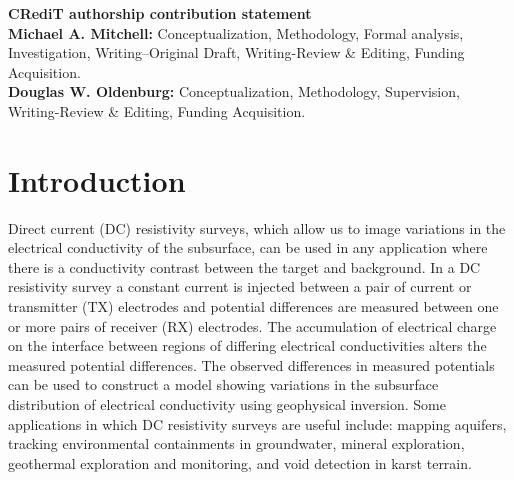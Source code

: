 \documentclass[preprint,authoryear,12pt]{elsarticle}
\begin{document}
\noindent \textbf{CRediT authorship contribution statement} \\
\textbf{Michael A. Mitchell:} Conceptualization, Methodology, Formal analysis, Investigation, Writing–Original Draft, Writing-Review \& Editing, Funding Acquisition. \\
\textbf{Douglas W. Oldenburg:} Conceptualization, Methodology, Supervision, Writing-Review \& Editing, Funding Acquisition.

\linenumbers


\section{Introduction}
\label{Introduction}

Direct current (DC) resistivity surveys, which allow us to image variations in the electrical conductivity of the subsurface, can be used in any application where there is a conductivity contrast between the target and background. In a DC resistivity survey a constant current is injected between a pair of current or transmitter (TX) electrodes and potential differences are measured between one or more pairs of receiver (RX) electrodes. The accumulation of electrical charge on the interface between regions of differing electrical conductivities alters the measured potential differences. The observed differences in measured potentials can be used to construct a model showing variations in the subsurface distribution of electrical conductivity using geophysical inversion. Some applications in which DC resistivity surveys are useful include: mapping aquifers, tracking environmental containments in groundwater,  mineral exploration, geothermal exploration and monitoring, and void detection in karst terrain.
\end{document}
